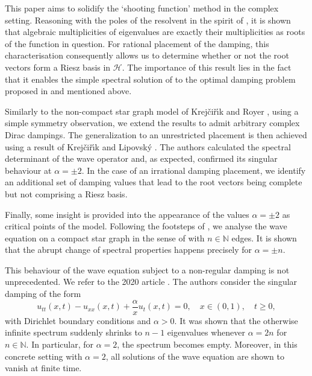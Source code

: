 \documentclass[11pt, a4paper,reqno]{amsart}
\theoremstyle{plain}
\theoremstyle{definition}
\theoremstyle{remark}
\newcommand{\1}{\mathds 1}
\begin{document}
 This paper aims to solidify the `shooting function' method in the complex setting. Reasoning with the poles of the resolvent in the spirit of \cite{CoxZuazua}, it is shown that algebraic multiplicities of eigenvalues are exactly their multiplicities as roots of the function in question. For rational placement of the damping, this characterisation consequently allows us to determine whether or not the root vectors form a Riesz basis in $\mathcal H$. The importance of this result lies in the fact that it enables the simple spectral solution of \cite{CoxZuazua} to the optimal damping problem proposed in \cite{BRT} and mentioned above.

 Similarly to the non-compact star graph model of Krej\v{c}i\v{r}\'\i k and Royer \cite{KrRoy}, using a simple symmetry observation, we extend the results to admit arbitrary complex Dirac dampings. The generalization to an unrestricted placement is then achieved using a result of Krej\v{c}i\v{r}\'\i k and Lipovsk\'y \cite{KrLip}. The authors calculated the spectral determinant of the wave operator and, as expected, confirmed its singular behaviour at $\alpha = \pm 2$. In the case of an irrational damping placement, we identify an additional set of damping values that lead to the root vectors being complete but not comprising a Riesz basis.

Finally, some insight is provided into the appearance of the values $\alpha = \pm 2$ as critical points of the model. Following the footsteps of \cite{KrRoy}, we analyse the wave equation on a compact star graph in the sense of \cite{Kurasov} with $n \in \mathbb N$ edges. It is shown that the abrupt change of spectral properties happens precisely for $\alpha = \pm n$.

This behaviour of the wave equation subject to a non-regular damping is not unprecedented. We refer to the 2020 article \cite{Siegl}. The authors consider the singular damping of the form
\[
u_{tt}(x,t) - u_{xx}(x,t) + \frac{\alpha}{x}u_t(x,t) = 0, \quad x \in (0, 1), \quad t \geq 0,
\]
with Dirichlet boundary conditions and $\alpha > 0$. It was shown that the otherwise infinite spectrum suddenly shrinks to $n-1$ eigenvalues whenever $\alpha = 2n$ for $n \in \mathbb N$. In particular, for $\alpha = 2$, the spectrum becomes empty. Moreover, in this concrete setting with $\alpha = 2$, all solutions of the wave equation are shown to vanish at finite time.
\end{document}
